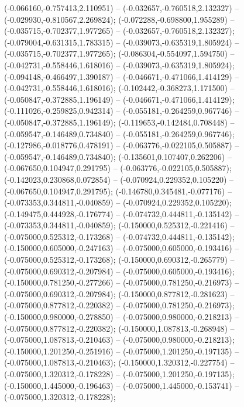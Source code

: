  (-0.066160,-0.757413,2.110951) -- (-0.032657,-0.760518,2.132327) -- (-0.029930,-0.810567,2.269824);
 (-0.072288,-0.698800,1.955289) -- (-0.035715,-0.702377,1.977265) -- (-0.032657,-0.760518,2.132327);
 (-0.079004,-0.631315,1.783315) -- (-0.039073,-0.635319,1.805924) -- (-0.035715,-0.702377,1.977265);
 (-0.086304,-0.554097,1.594750) -- (-0.042731,-0.558446,1.618016) -- (-0.039073,-0.635319,1.805924);
 (-0.094148,-0.466497,1.390187) -- (-0.046671,-0.471066,1.414129) -- (-0.042731,-0.558446,1.618016);
 (-0.102442,-0.368273,1.171500) -- (-0.050847,-0.372885,1.196149) -- (-0.046671,-0.471066,1.414129);
 (-0.111026,-0.259825,0.942314) -- (-0.055181,-0.264259,0.967746) -- (-0.050847,-0.372885,1.196149);
 (-0.119653,-0.142484,0.708448) -- (-0.059547,-0.146489,0.734840) -- (-0.055181,-0.264259,0.967746);
 (-0.127986,-0.018776,0.478191) -- (-0.063776,-0.022105,0.505887) -- (-0.059547,-0.146489,0.734840);
 (-0.135601,0.107407,0.262206) -- (-0.067650,0.104947,0.291795) -- (-0.063776,-0.022105,0.505887);
 (-0.142023,0.230868,0.072854) -- (-0.070924,0.229352,0.105220) -- (-0.067650,0.104947,0.291795);
 (-0.146780,0.345481,-0.077176) -- (-0.073353,0.344811,-0.040859) -- (-0.070924,0.229352,0.105220);
 (-0.149475,0.444928,-0.176774) -- (-0.074732,0.444811,-0.135142) -- (-0.073353,0.344811,-0.040859);
 (-0.150000,0.525312,-0.221416) -- (-0.075000,0.525312,-0.173268) -- (-0.074732,0.444811,-0.135142);
 (-0.150000,0.605000,-0.247163) -- (-0.075000,0.605000,-0.193416) -- (-0.075000,0.525312,-0.173268);
 (-0.150000,0.690312,-0.265779) -- (-0.075000,0.690312,-0.207984) -- (-0.075000,0.605000,-0.193416);
 (-0.150000,0.781250,-0.277266) -- (-0.075000,0.781250,-0.216973) -- (-0.075000,0.690312,-0.207984);
 (-0.150000,0.877812,-0.281623) -- (-0.075000,0.877812,-0.220382) -- (-0.075000,0.781250,-0.216973);
 (-0.150000,0.980000,-0.278850) -- (-0.075000,0.980000,-0.218213) -- (-0.075000,0.877812,-0.220382);
 (-0.150000,1.087813,-0.268948) -- (-0.075000,1.087813,-0.210463) -- (-0.075000,0.980000,-0.218213);
 (-0.150000,1.201250,-0.251916) -- (-0.075000,1.201250,-0.197135) -- (-0.075000,1.087813,-0.210463);
 (-0.150000,1.320312,-0.227754) -- (-0.075000,1.320312,-0.178228) -- (-0.075000,1.201250,-0.197135);
 (-0.150000,1.445000,-0.196463) -- (-0.075000,1.445000,-0.153741) -- (-0.075000,1.320312,-0.178228);
